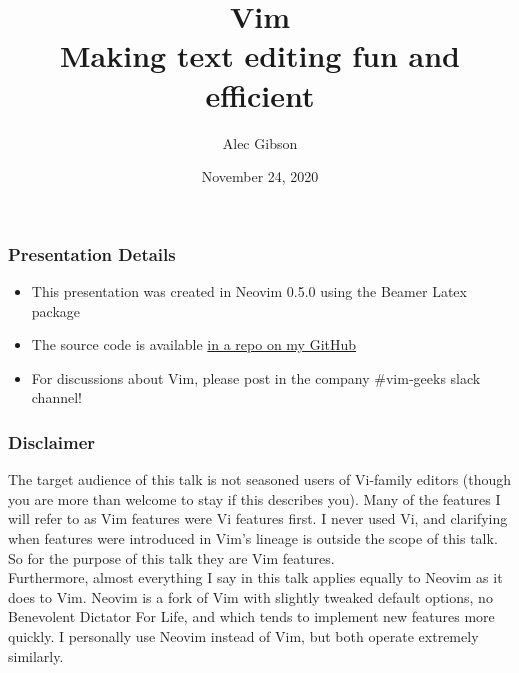 \documentclass{beamer}
\title[\textcolor{white}{Vim - Fun and Efficient}]{\huge Vim \\
    \large Making text editing fun and efficient
}
\author{Alec Gibson}
\institute[BlueCat]
{
    BlueCat Networks \\
    \medskip
    \textit{agibson@bluecatnetworks.com}
}
\date{November 24, 2020}
\begin{document}
\begin{frame}[fragile]
    \titlepage %
\end{frame}

\begin{frame}[fragile]
    \frametitle{Presentation Details}
    \begin{itemize}
	\item This presentation was created in Neovim 0.5.0 using the Beamer Latex package
	\item The source code is available \href{https://github.com/alec-gibson/vim-fun-and-efficient}{in a repo on my GitHub}
	\item For discussions about Vim, please post in the company \#vim-geeks slack channel!
    \end{itemize}
\end{frame}

\begin{frame}[fragile]
    \frametitle{Disclaimer}
    \small The target audience of this talk is not seasoned users of Vi-family editors (though you are more than welcome to stay if this describes you). Many of the features I will refer to as Vim features were Vi features first. I never used Vi, and clarifying when features were introduced in Vim's lineage is outside the scope of this talk. So for the purpose of this talk they are Vim features.\\
    \vspace{0.5cm}
    Furthermore, almost everything I say in this talk applies equally to Neovim as it does to Vim. Neovim is a fork of Vim with slightly tweaked default options, no Benevolent Dictator For Life, and which tends to implement new features more quickly. I personally use Neovim instead of Vim, but both operate extremely similarly.
\end{frame}
\end{document}
